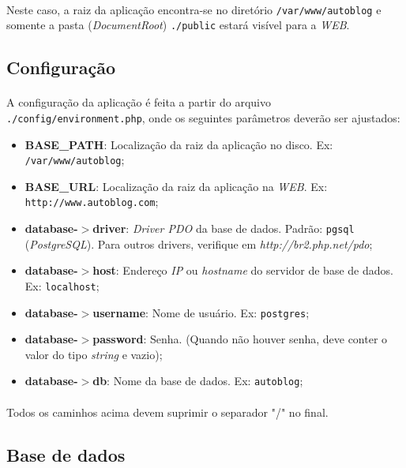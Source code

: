 \documentclass[a4paper,12pt]{article}
\begin{document}
\paragraph{}
Neste caso, a raiz da aplicação encontra-se no diretório \texttt{/var/www/autoblog} e somente a pasta (\emph{DocumentRoot}) \texttt{./public} estará visível para a \emph{WEB}.

\subsection{Configuração}

\paragraph{}
A configuração da aplicação é feita a partir do arquivo \texttt{./config/environment.php}, onde os seguintes parâmetros deverão ser ajustados:

\begin{itemize}
\item \textbf{BASE\_PATH}: Localização da raiz da aplicação no disco. Ex: \texttt{/var/www/autoblog};
\item \textbf{BASE\_URL}: Localização da raiz da aplicação na \emph{WEB}. Ex: \texttt{http://www.autoblog.com};
\item \textbf{database-$>$driver}: \emph{Driver PDO} da base de dados. Padrão: \texttt{pgsql} (\emph{PostgreSQL}). Para outros drivers, verifique em \emph{http://br2.php.net/pdo};
\item \textbf{database-$>$host}: Endereço \emph{IP} ou \emph{hostname} do servidor de base de dados. Ex: \texttt{localhost};
\item \textbf{database-$>$username}: Nome de usuário. Ex: \texttt{postgres};
\item \textbf{database-$>$password}: Senha. (Quando não houver senha, deve conter o valor do tipo \emph{string} e vazio);
\item \textbf{database-$>$db}: Nome da base de dados. Ex: \texttt{autoblog};
\end{itemize}

\paragraph{}
Todos os caminhos acima devem suprimir o separador "/" no final.

\subsection{Base de dados}
\end{document}
